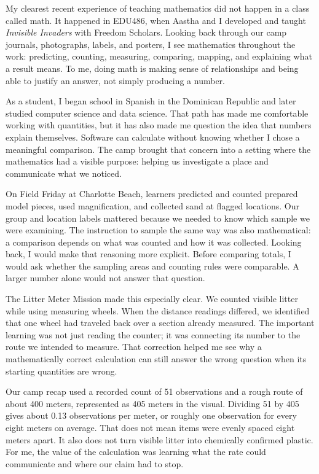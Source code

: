 
My clearest recent experience of teaching mathematics did not happen in a class called math. It happened in EDU486, when Aastha and I developed and taught \textit{Invisible Invaders} with Freedom Scholars. Looking back through our camp journals, photographs, labels, and posters, I see mathematics throughout the work: predicting, counting, measuring, comparing, mapping, and explaining what a result means. To me, doing math is making sense of relationships and being able to justify an answer, not simply producing a number.

As a student, I began school in Spanish in the Dominican Republic and later studied computer science and data science. That path has made me comfortable working with quantities, but it has also made me question the idea that numbers explain themselves. Software can calculate without knowing whether I chose a meaningful comparison. The camp brought that concern into a setting where the mathematics had a visible purpose: helping us investigate a place and communicate what we noticed.

On Field Friday at Charlotte Beach, learners predicted and counted prepared model pieces, used magnification, and collected sand at flagged locations. Our group and location labels mattered because we needed to know which sample we were examining. The instruction to sample the same way was also mathematical: a comparison depends on what was counted and how it was collected. Looking back, I would make that reasoning more explicit. Before comparing totals, I would ask whether the sampling areas and counting rules were comparable. A larger number alone would not answer that question.

The Litter Meter Mission made this especially clear. We counted visible litter while using measuring wheels. When the distance readings differed, we identified that one wheel had traveled back over a section already measured. The important learning was not just reading the counter; it was connecting its number to the route we intended to measure. That correction helped me see why a mathematically correct calculation can still answer the wrong question when its starting quantities are wrong.

Our camp recap used a recorded count of 51 observations and a rough route of about 400 meters, represented as 405 meters in the visual. Dividing 51 by 405 gives about 0.13 observations per meter, or roughly one observation for every eight meters on average. That does not mean items were evenly spaced eight meters apart. It also does not turn visible litter into chemically confirmed plastic. For me, the value of the calculation was learning what the rate could communicate and where our claim had to stop.

